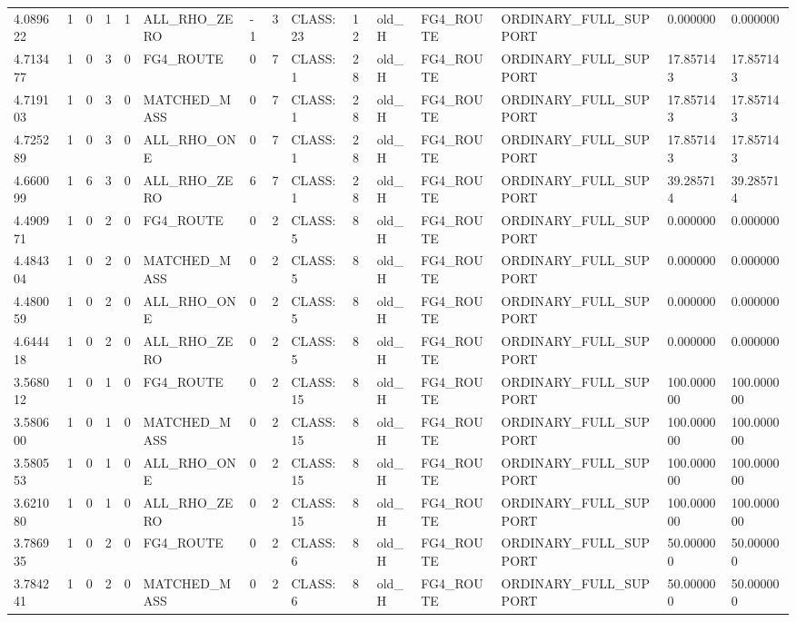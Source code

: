 \begin{tabular}{lllllllllllllll}
4.089622 & 1 & 0 & 1 & 1 & ALL\_RHO\_ZERO & -1 & 3 & CLASS:23 & 12 & old\_H & FG4\_ROUTE & ORDINARY\_FULL\_SUPPORT & 0.000000 & 0.000000 \\
4.713477 & 1 & 0 & 3 & 0 & FG4\_ROUTE & 0 & 7 & CLASS:1 & 28 & old\_H & FG4\_ROUTE & ORDINARY\_FULL\_SUPPORT & 17.857143 & 17.857143 \\
4.719103 & 1 & 0 & 3 & 0 & MATCHED\_MASS & 0 & 7 & CLASS:1 & 28 & old\_H & FG4\_ROUTE & ORDINARY\_FULL\_SUPPORT & 17.857143 & 17.857143 \\
4.725289 & 1 & 0 & 3 & 0 & ALL\_RHO\_ONE & 0 & 7 & CLASS:1 & 28 & old\_H & FG4\_ROUTE & ORDINARY\_FULL\_SUPPORT & 17.857143 & 17.857143 \\
4.660099 & 1 & 6 & 3 & 0 & ALL\_RHO\_ZERO & 6 & 7 & CLASS:1 & 28 & old\_H & FG4\_ROUTE & ORDINARY\_FULL\_SUPPORT & 39.285714 & 39.285714 \\
4.490971 & 1 & 0 & 2 & 0 & FG4\_ROUTE & 0 & 2 & CLASS:5 & 8 & old\_H & FG4\_ROUTE & ORDINARY\_FULL\_SUPPORT & 0.000000 & 0.000000 \\
4.484304 & 1 & 0 & 2 & 0 & MATCHED\_MASS & 0 & 2 & CLASS:5 & 8 & old\_H & FG4\_ROUTE & ORDINARY\_FULL\_SUPPORT & 0.000000 & 0.000000 \\
4.480059 & 1 & 0 & 2 & 0 & ALL\_RHO\_ONE & 0 & 2 & CLASS:5 & 8 & old\_H & FG4\_ROUTE & ORDINARY\_FULL\_SUPPORT & 0.000000 & 0.000000 \\
4.644418 & 1 & 0 & 2 & 0 & ALL\_RHO\_ZERO & 0 & 2 & CLASS:5 & 8 & old\_H & FG4\_ROUTE & ORDINARY\_FULL\_SUPPORT & 0.000000 & 0.000000 \\
3.568012 & 1 & 0 & 1 & 0 & FG4\_ROUTE & 0 & 2 & CLASS:15 & 8 & old\_H & FG4\_ROUTE & ORDINARY\_FULL\_SUPPORT & 100.000000 & 100.000000 \\
3.580600 & 1 & 0 & 1 & 0 & MATCHED\_MASS & 0 & 2 & CLASS:15 & 8 & old\_H & FG4\_ROUTE & ORDINARY\_FULL\_SUPPORT & 100.000000 & 100.000000 \\
3.580553 & 1 & 0 & 1 & 0 & ALL\_RHO\_ONE & 0 & 2 & CLASS:15 & 8 & old\_H & FG4\_ROUTE & ORDINARY\_FULL\_SUPPORT & 100.000000 & 100.000000 \\
3.621080 & 1 & 0 & 1 & 0 & ALL\_RHO\_ZERO & 0 & 2 & CLASS:15 & 8 & old\_H & FG4\_ROUTE & ORDINARY\_FULL\_SUPPORT & 100.000000 & 100.000000 \\
3.786935 & 1 & 0 & 2 & 0 & FG4\_ROUTE & 0 & 2 & CLASS:6 & 8 & old\_H & FG4\_ROUTE & ORDINARY\_FULL\_SUPPORT & 50.000000 & 50.000000 \\
3.784241 & 1 & 0 & 2 & 0 & MATCHED\_MASS & 0 & 2 & CLASS:6 & 8 & old\_H & FG4\_ROUTE & ORDINARY\_FULL\_SUPPORT & 50.000000 & 50.000000 \\

\end{tabular}
